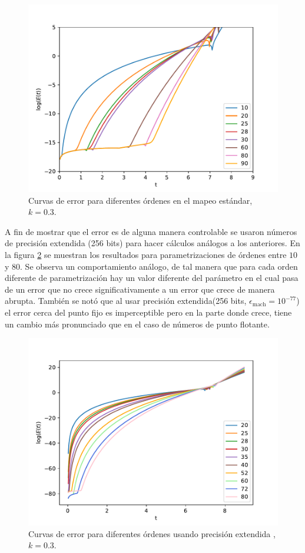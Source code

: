 \begin{figure}[H]
\centering
\includegraphics[scale=0.7]{errorf64}
\caption{Curvas de error para diferentes órdenes en el mapeo estándar, $k=0.3$. }
\label{erroresf64}
\end{figure}
A fin de mostrar que el error es de alguna manera controlable se usaron números de precisión extendida (256 bits) para hacer cálculos análogos a los anteriores. En la figura \ref{erroresBig} se muestran los resultados para parametrizaciones de órdenes entre $10$ y $80$. Se observa un comportamiento análogo, de tal manera que para cada orden diferente de parametrización hay un valor diferente del parámetro en el cual pasa de un error que no crece significativamente a un error que crece de manera abrupta. También se notó que al usar precisión extendida(256 bits, $\epsilon_{\mathrm{mach}}=10^{-77}$) el error cerca del punto fijo es imperceptible pero en la parte donde crece, tiene un cambio más pronunciado que en el caso de números de punto flotante. 

\begin{figure}[H]
\centering
\includegraphics[scale=0.7]{errorbf}
\caption{Curvas de error para diferentes órdenes usando precisión extendida ,$k=0.3$. }
\label{erroresBig}
\end{figure}

